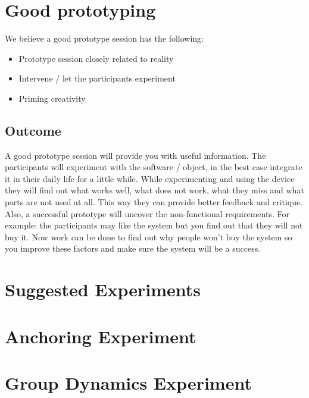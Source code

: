\documentclass{article}
\begin{document}
\section{Good prototyping}
We believe a good prototype session has the following:

\begin{itemize}
\item Prototype session closely related to reality
\item Intervene / let the participants experiment
\item Priming creativity 
\end{itemize}
 
\subsection{Outcome}
A good prototype session will provide you with useful information. The participants
will experiment with the software / object, in the best case integrate it in their
daily life for a little while. While experimenting and using the device they will
find out what works well, what does not work, what they miss and what parts
are not used at all. This way they can provide better feedback and critique.
Also, a successful prototype will uncover the non-functional requirements.
For example: the participants may like the system but you find out that they will not
buy it. Now work can be done to find out why people won't buy the system so you improve these factors and  make sure the system will be a success.


\section{Suggested Experiments}



\section{Anchoring Experiment}



\section{Group Dynamics Experiment}


\end{document}
